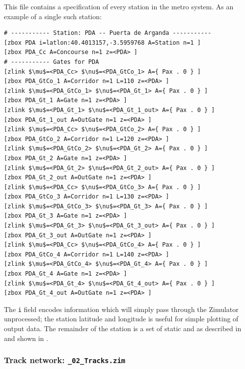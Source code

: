 This file contains a specification of every station in the metro system.
As an example of a single such station:
\begin{lstlisting}[mathescape] 
# ----------- Station: PDA -- Puerta de Arganda -----------
[zbox PDA i=latlon:40.4013157,-3.5959768 A=Station n=1 ]
[zbox PDA_Cc A=Concourse n=1 z=<PDA> ]
# ----------- Gates for PDA
[zlink $\mu$=<PDA_Cc> $\nu$=<PDA_GtCo_1> A={ Pax . 0 } ]
[zbox PDA_GtCo_1 A=Corridor n=1 L=110 z=<PDA> ]
[zlink $\mu$=<PDA_GtCo_1> $\nu$=<PDA_Gt_1> A={ Pax . 0 } ]
[zbox PDA_Gt_1 A=Gate n=1 z=<PDA> ]
[zlink $\mu$=<PDA_Gt_1> $\nu$=<PDA_Gt_1_out> A={ Pax . 0 } ]
[zbox PDA_Gt_1_out A=OutGate n=1 z=<PDA> ]
[zlink $\mu$=<PDA_Cc> $\nu$=<PDA_GtCo_2> A={ Pax . 0 } ]
[zbox PDA_GtCo_2 A=Corridor n=1 L=120 z=<PDA> ]
[zlink $\mu$=<PDA_GtCo_2> $\nu$=<PDA_Gt_2> A={ Pax . 0 } ]
[zbox PDA_Gt_2 A=Gate n=1 z=<PDA> ]
[zlink $\mu$=<PDA_Gt_2> $\nu$=<PDA_Gt_2_out> A={ Pax . 0 } ]
[zbox PDA_Gt_2_out A=OutGate n=1 z=<PDA> ]
[zlink $\mu$=<PDA_Cc> $\nu$=<PDA_GtCo_3> A={ Pax . 0 } ]
[zbox PDA_GtCo_3 A=Corridor n=1 L=130 z=<PDA> ]
[zlink $\mu$=<PDA_GtCo_3> $\nu$=<PDA_Gt_3> A={ Pax . 0 } ]
[zbox PDA_Gt_3 A=Gate n=1 z=<PDA> ]
[zlink $\mu$=<PDA_Gt_3> $\nu$=<PDA_Gt_3_out> A={ Pax . 0 } ]
[zbox PDA_Gt_3_out A=OutGate n=1 z=<PDA> ]
[zlink $\mu$=<PDA_Cc> $\nu$=<PDA_GtCo_4> A={ Pax . 0 } ]
[zbox PDA_GtCo_4 A=Corridor n=1 L=140 z=<PDA> ]
[zlink $\mu$=<PDA_GtCo_4> $\nu$=<PDA_Gt_4> A={ Pax . 0 } ]
[zbox PDA_Gt_4 A=Gate n=1 z=<PDA> ]
[zlink $\mu$=<PDA_Gt_4> $\nu$=<PDA_Gt_4_out> A={ Pax . 0 } ]
[zbox PDA_Gt_4_out A=OutGate n=1 z=<PDA> ]
\end{lstlisting}
The {\tt i} field encodes information which will simply pass through the
Zimulator unprocessed; the station latitude and longitude is useful
for simple plotting of output data.
The remainder of the station is a set of static  and 
as described in  and shown in .

\subsubsection{Track network: {\tt \_02\_Tracks.zim}}

